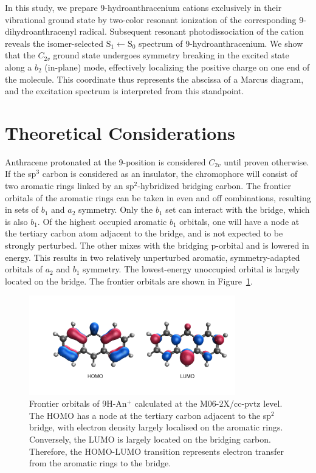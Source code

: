 \documentclass[journal=jpcafh,manuscript=article,layout=onecolumn, 12pt]{achemso}
\begin{document}
In this study, we prepare 9-hydroanthracenium cations exclusively in their vibrational ground state by two-color resonant ionization of the corresponding 9-dihydroanthracenyl radical. Subsequent resonant photodissociation of the cation reveals the isomer-selected $\text{S}_1\leftarrow\text{S}_0$ spectrum of 9-hydroanthracenium. We show that the $C_{2v}$ ground state undergoes symmetry breaking in the excited state along a $b_2$ (in-plane) mode, effectively localizing the positive charge on one end of the molecule. This coordinate thus represents the abscissa of a Marcus diagram, and the excitation spectrum is interpreted from this standpoint.

\section{Theoretical Considerations}
Anthracene protonated at the 9-position is considered $C_{2v}$ until proven otherwise. If the sp$^3$ carbon is considered as an insulator, the chromophore will consist of two aromatic rings linked by an sp$^2$-hybridized bridging carbon. The frontier orbitals of the aromatic rings can be taken in even and off combinations, resulting in sets of $b_1$ and $a_2$ symmetry. Only the $b_1$ set can interact with the bridge, which is also $b_1$. Of the highest occupied aromatic $b_1$ orbitals, one will have a node at the tertiary carbon atom adjacent to the bridge, and is not expected to be strongly perturbed. The other mixes with the bridging p-orbital and is lowered in energy. This results in two relatively unperturbed aromatic, symmetry-adapted orbitals of $a_2$ and $b_1$ symmetry. The lowest-energy unoccupied orbital is largely located on the bridge. The frontier orbitals are shown in Figure~\ref{Fig:1}.

\begin{figure} [h]
	\includegraphics[width=0.8\textwidth]{figures/Figure1}
	\caption{Frontier orbitals of 9H-An$^+$ calculated at the M06-2X/cc-pvtz level. The HOMO has a node at the tertiary carbon adjacent to the sp$^2$ bridge, with electron density largely localised on the aromatic rings. Conversely, the LUMO is largely located on the bridging carbon. Therefore, the HOMO-LUMO transition represents electron transfer from the aromatic rings to the bridge.}
	\label{Fig:1}
\end{figure}
\end{document}
